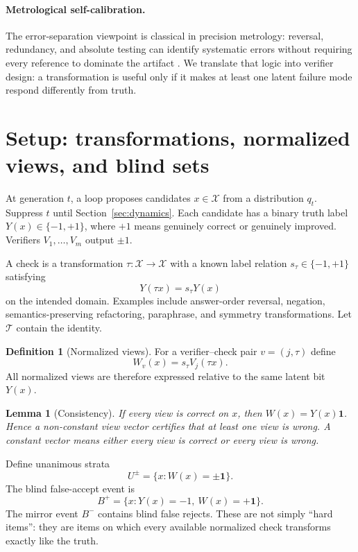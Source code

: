 \documentclass[11pt]{article}
\newtheorem{lemma}[theorem]{Lemma}
\theoremstyle{definition}
\newtheorem{definition}[theorem]{Definition}
\theoremstyle{remark}
\newcommand{\one}{\mathbf{1}}
\newcommand{\cT}{\mathcal{T}}
\newcommand{\cX}{\mathcal{X}}
\begin{document}
\paragraph{Metrological self-calibration.}
The error-separation viewpoint is classical in precision metrology: reversal, redundancy, and absolute testing can identify systematic errors without requiring every reference to dominate the artifact \cite{donaldson1972,evans1996}. We translate that logic into verifier design: a transformation is useful only if it makes at least one latent failure mode respond differently from truth.

\section{Setup: transformations, normalized views, and blind sets}
\label{sec:setup}

At generation $t$, a loop proposes candidates $x\in\cX$ from a distribution $q_t$. Suppress $t$ until Section~\ref{sec:dynamics}. Each candidate has a binary truth label $Y(x)\in\{-1,+1\}$, where $+1$ means genuinely correct or genuinely improved. Verifiers $V_1,\ldots,V_m$ output $\pm1$.

A check is a transformation $\tau:\cX\to\cX$ with a known label relation $s_\tau\in\{-1,+1\}$ satisfying
\[
Y(\tau x)=s_\tau Y(x)
\]
on the intended domain. Examples include answer-order reversal, negation, semantics-preserving refactoring, paraphrase, and symmetry transformations. Let $\cT$ contain the identity.

\begin{definition}[Normalized views]
For a verifier--check pair $v=(j,\tau)$ define
\[
W_v(x)=s_\tau V_j(\tau x).
\]
All normalized views are therefore expressed relative to the same latent bit $Y(x)$.
\end{definition}

\begin{lemma}[Consistency]
If every view is correct on $x$, then $W(x)=Y(x)\one$. Hence a non-constant view vector certifies that at least one view is wrong. A constant vector means either every view is correct or every view is wrong.
\end{lemma}

Define unanimous strata
\[
U^\pm=\{x:W(x)=\pm\one\}.
\]
The blind false-accept event is
\[
B^+=\{x:Y(x)=-1,\ W(x)=+\one\}.
\]
The mirror event $B^-$ contains blind false rejects. These are not simply ``hard items'': they are items on which every available normalized check transforms exactly like the truth.
\end{document}
